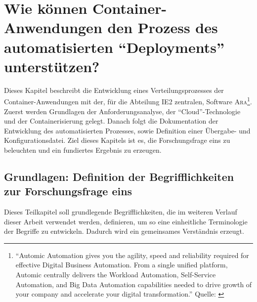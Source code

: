 \chapter[Forschungsfrage 1]{Wie können Container-Anwendungen den Prozess des automatisierten \enquote{Deployments} unterstützen?} \label{ff1}
Dieses Kapitel beschreibt die Entwicklung eines Verteilungsprozesses der Container-Anwendungen mit der, für die Abteilung \ac{IE2} zentralen, Software \textsc{Ara}\footnote{\enquote{Automic Automation gives you the agility, speed and reliability required for effective Digital Business Automation. From a single unified platform, Automic centrally delivers the Workload Automation, Self-Service Automation, and Big Data Automation capabilities needed to drive growth of your company and accelerate your digital transformation.} Quelle: \cite{broadcom_inc_automic_2020}}. Zuerst werden Grundlagen der Anforderungsanalyse, der \enquote{Cloud}-Technologie und der Containerisierung gelegt. Danach folgt die Dokumentation der Entwicklung des automatisierten Prozesses, sowie Definition einer Übergabe- und Konfigurationsdatei. Ziel dieses Kapitels ist es, die Forschungsfrage eins zu beleuchten und ein fundiertes Ergebnis zu erzeugen.

\section{Grundlagen: Definition der Begrifflichkeiten zur Forschungsfrage eins}
Dieses Teilkapitel soll grundlegende Begrifflichkeiten, die im weiteren Verlauf dieser Arbeit verwendet werden, definieren, um so eine einheitliche Terminologie der Begriffe zu entwickeln. Dadurch wird ein gemeinsames Verständnis erzeugt.


